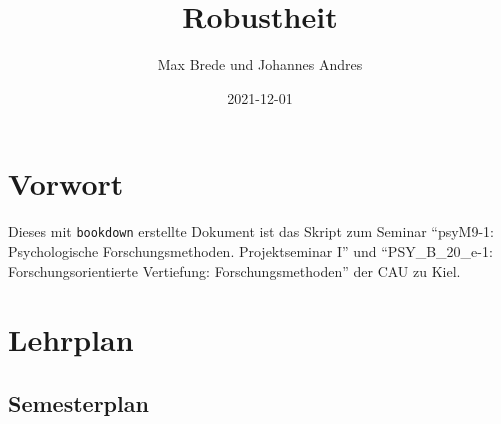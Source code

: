 \documentclass[
]{book}
\title{Robustheit}
\author{Max Brede und Johannes Andres}
\date{2021-12-01}
\begin{document}
\maketitle

{
\setcounter{tocdepth}{1}
\tableofcontents
}
\hypertarget{vorwort}{%
\chapter{Vorwort}\label{vorwort}}

Dieses mit \texttt{bookdown} erstellte Dokument ist das Skript zum Seminar ``psyM9-1: Psychologische Forschungsmethoden. Projektseminar I'' und ``PSY\_B\_20\_e-1: Forschungsorientierte Vertiefung: Forschungsmethoden'' der CAU zu Kiel.

\hypertarget{lehrplan}{%
\chapter{Lehrplan}\label{lehrplan}}

\hypertarget{semesterplan}{%
\section{Semesterplan}\label{semesterplan}}

\scriptsize
\end{document}
